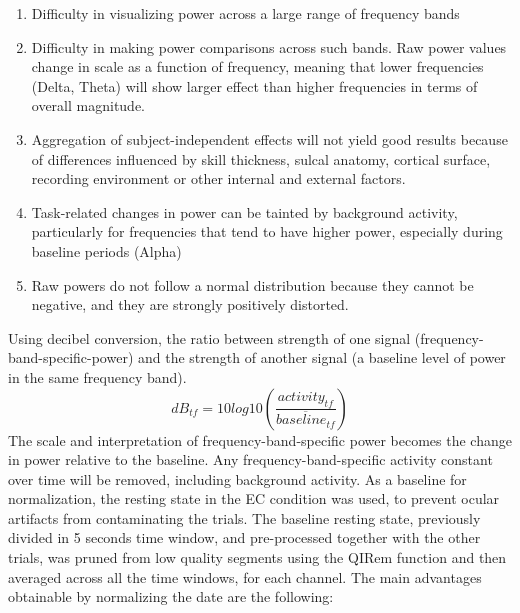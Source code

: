 \begin{enumerate}
\item 	Difficulty in visualizing power across a large range of frequency bands
\item 	Difficulty in making power comparisons across such bands. Raw power values change in scale as a function of frequency, meaning that lower frequencies (Delta, Theta) will show larger effect than higher frequencies in terms of overall magnitude.
\item 	Aggregation of subject-independent effects will not yield good results because of differences influenced by skill thickness, sulcal anatomy, cortical surface, recording environment or other internal and external factors.
\item 	Task-related changes in power can be tainted by background activity, particularly for frequencies that tend to have higher power, especially during baseline periods (Alpha)
\item 	Raw powers do not follow a normal distribution because they cannot be negative, and they are strongly positively distorted.
\end{enumerate}
Using decibel conversion, the ratio between strength of one signal (frequency-band-specific-power) and the strength of another signal (a baseline level of power in the same frequency band).
\[dB_{tf} = 10log10 \left(\frac{activity_{tf}}{\overline{baseline_{tf}}} \right)\]
The scale and interpretation of frequency-band-specific power becomes the change in power relative to the baseline. Any frequency-band-specific activity constant over time will be removed, including background activity. As a baseline for normalization, the resting state in the \ac{EC} condition was used, to prevent ocular artifacts from contaminating the trials. The baseline resting state, previously divided in 5 seconds time window, and pre-processed together with the other trials, was pruned from low quality segments using the \ac{QIRem} function and then averaged across all the time windows, for each channel. The main advantages obtainable by normalizing the date are the following: 

